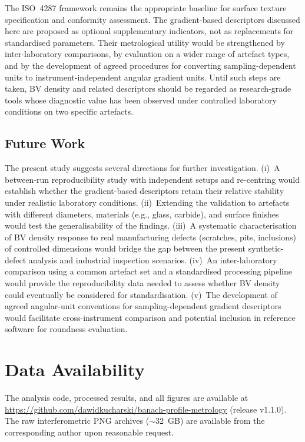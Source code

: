 \documentclass[review]{elsarticle}
\begin{document}
The ISO~4287 framework remains the appropriate baseline for surface texture specification and conformity assessment. The gradient-based descriptors discussed here are proposed as optional supplementary indicators, not as replacements for standardised parameters. Their metrological utility would be strengthened by inter-laboratory comparisons, by evaluation on a wider range of artefact types, and by the development of agreed procedures for converting sampling-dependent units to instrument-independent angular gradient units. Until such steps are taken, BV density and related descriptors should be regarded as research-grade tools whose diagnostic value has been observed under controlled laboratory conditions on two specific artefacts.

\subsection{Future Work}
The present study suggests several directions for further investigation. (i)~A between-run reproducibility study with independent setups and re-centring would establish whether the gradient-based descriptors retain their relative stability under realistic laboratory conditions. (ii)~Extending the validation to artefacts with different diameters, materials (e.g., glass, carbide), and surface finishes would test the generalisability of the findings. (iii)~A systematic characterisation of BV density response to real manufacturing defects (scratches, pits, inclusions) of controlled dimensions would bridge the gap between the present synthetic-defect analysis and industrial inspection scenarios. (iv)~An inter-laboratory comparison using a common artefact set and a standardised processing pipeline would provide the reproducibility data needed to assess whether BV density could eventually be considered for standardisation. (v)~The development of agreed angular-unit conventions for sampling-dependent gradient descriptors would facilitate cross-instrument comparison and potential inclusion in reference software for roundness evaluation.

\section*{Data Availability}
The analysis code, processed results, and all figures are available at \url{https://github.com/dawidkucharski/banach-profile-metrology} (release v1.1.0). The raw interferometric PNG archives ($\sim$32~GB) are available from the corresponding author upon reasonable request.


\end{document}
